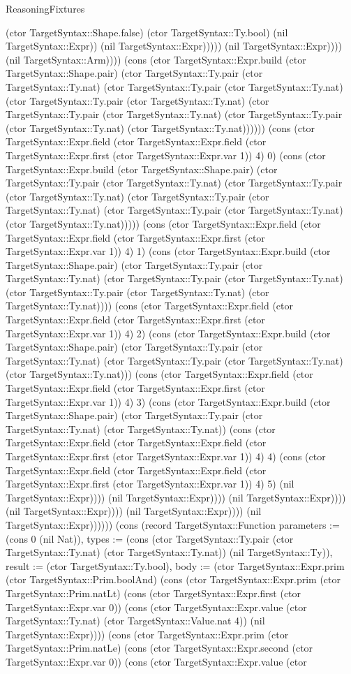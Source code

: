 \begin{lexlean}{ReasoningFixtures}
\begin{semanticmodule}
{(ctor TargetSyntax::Shape.false) (ctor TargetSyntax::Ty.bool) (nil TargetSyntax::Expr)) (nil TargetSyntax::Expr))))) (nil TargetSyntax::Expr)))) (nil TargetSyntax::Arm)))) (cons (ctor TargetSyntax::Expr.build (ctor TargetSyntax::Shape.pair) (ctor TargetSyntax::Ty.pair (ctor TargetSyntax::Ty.nat) (ctor TargetSyntax::Ty.pair (ctor TargetSyntax::Ty.nat) (ctor TargetSyntax::Ty.pair (ctor TargetSyntax::Ty.nat) (ctor TargetSyntax::Ty.pair (ctor TargetSyntax::Ty.nat) (ctor TargetSyntax::Ty.pair (ctor TargetSyntax::Ty.nat) (ctor TargetSyntax::Ty.nat)))))) (cons (ctor TargetSyntax::Expr.field (ctor TargetSyntax::Expr.field (ctor TargetSyntax::Expr.first (ctor TargetSyntax::Expr.var 1)) 4) 0) (cons (ctor TargetSyntax::Expr.build (ctor TargetSyntax::Shape.pair) (ctor TargetSyntax::Ty.pair (ctor TargetSyntax::Ty.nat) (ctor TargetSyntax::Ty.pair (ctor TargetSyntax::Ty.nat) (ctor TargetSyntax::Ty.pair (ctor TargetSyntax::Ty.nat) (ctor TargetSyntax::Ty.pair (ctor TargetSyntax::Ty.nat) (ctor TargetSyntax::Ty.nat))))) (cons (ctor TargetSyntax::Expr.field (ctor TargetSyntax::Expr.field (ctor TargetSyntax::Expr.first (ctor TargetSyntax::Expr.var 1)) 4) 1) (cons (ctor TargetSyntax::Expr.build (ctor TargetSyntax::Shape.pair) (ctor TargetSyntax::Ty.pair (ctor TargetSyntax::Ty.nat) (ctor TargetSyntax::Ty.pair (ctor TargetSyntax::Ty.nat) (ctor TargetSyntax::Ty.pair (ctor TargetSyntax::Ty.nat) (ctor TargetSyntax::Ty.nat)))) (cons (ctor TargetSyntax::Expr.field (ctor TargetSyntax::Expr.field (ctor TargetSyntax::Expr.first (ctor TargetSyntax::Expr.var 1)) 4) 2) (cons (ctor TargetSyntax::Expr.build (ctor TargetSyntax::Shape.pair) (ctor TargetSyntax::Ty.pair (ctor TargetSyntax::Ty.nat) (ctor TargetSyntax::Ty.pair (ctor TargetSyntax::Ty.nat) (ctor TargetSyntax::Ty.nat))) (cons (ctor TargetSyntax::Expr.field (ctor TargetSyntax::Expr.field (ctor TargetSyntax::Expr.first (ctor TargetSyntax::Expr.var 1)) 4) 3) (cons (ctor TargetSyntax::Expr.build (ctor TargetSyntax::Shape.pair) (ctor TargetSyntax::Ty.pair (ctor TargetSyntax::Ty.nat) (ctor TargetSyntax::Ty.nat)) (cons (ctor TargetSyntax::Expr.field (ctor TargetSyntax::Expr.field (ctor TargetSyntax::Expr.first (ctor TargetSyntax::Expr.var 1)) 4) 4) (cons (ctor TargetSyntax::Expr.field (ctor TargetSyntax::Expr.field (ctor TargetSyntax::Expr.first (ctor TargetSyntax::Expr.var 1)) 4) 5) (nil TargetSyntax::Expr)))) (nil TargetSyntax::Expr)))) (nil TargetSyntax::Expr)))) (nil TargetSyntax::Expr)))) (nil TargetSyntax::Expr)))) (nil TargetSyntax::Expr)))))}) (cons (record TargetSyntax::Function {parameters := (cons 0 (nil Nat)), types := (cons (ctor TargetSyntax::Ty.pair (ctor TargetSyntax::Ty.nat) (ctor TargetSyntax::Ty.nat)) (nil TargetSyntax::Ty)), result := (ctor TargetSyntax::Ty.bool), body := (ctor TargetSyntax::Expr.prim (ctor TargetSyntax::Prim.boolAnd) (cons (ctor TargetSyntax::Expr.prim (ctor TargetSyntax::Prim.natLt) (cons (ctor TargetSyntax::Expr.first (ctor TargetSyntax::Expr.var 0)) (cons (ctor TargetSyntax::Expr.value (ctor TargetSyntax::Ty.nat) (ctor TargetSyntax::Value.nat 4)) (nil TargetSyntax::Expr)))) (cons (ctor TargetSyntax::Expr.prim (ctor TargetSyntax::Prim.natLe) (cons (ctor TargetSyntax::Expr.second (ctor TargetSyntax::Expr.var 0)) (cons (ctor TargetSyntax::Expr.value (ctor }
\end{semanticmodule}
\end{lexlean}
